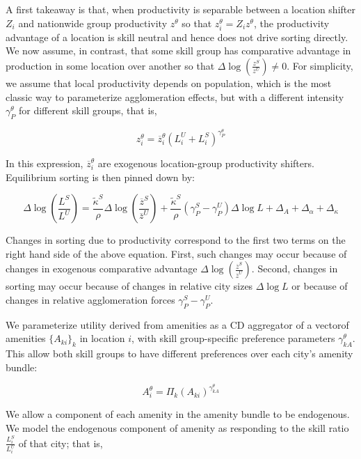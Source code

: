A first takeaway is that, when productivity is separable between a location shifter $Z_i$ and nationwide group productivity $z^{\theta}$ so that $z_i^{\theta} = Z_i z^{\theta}$, the productivity advantage of a location is skill neutral and hence does not drive sorting directly. We now assume, in contrast, that some skill group has comparative advantage in production in some location over another so that $\Delta \log(\frac{z^S}{z^U}) \neq 0$. For simplicity, we assume that local productivity depends on population, which is the most classic way to parameterize agglomeration effects, but with a different intensity $\gamma_P^{\theta}$ for different skill groups, that is,

\begin{equation}
  z_i^{\theta} = \overline{z}_i^{\theta}(L_i^U + L_i^S)^{\gamma_P^{\theta}} 
\end{equation}

In this expression, $\overline{z}_i^{\theta}$ are exogenous location-group productivity shifters. Equilibrium sorting is then pinned down by:

\begin{equation*}
  \Delta \log(\frac{L^S}{L^U}) = \frac{\tilde{\kappa}^S}{\rho} \Delta \log(\frac{\overline{z}^S}{\overline{z}^U}) + \frac{\tilde{\kappa}^S}{\rho}(\gamma_P^S - \gamma_P^U) \Delta \log L + \Delta_A + \Delta_{\alpha} + \Delta_{\kappa}
\end{equation*}

Changes in sorting due to productivity correspond to the first two terms on the right hand side of the above equation. First, such changes may occur because of changes in exogenous comparative advantage $\Delta \log(\frac{\overline{z}^S}{\overline{z}^U})$. Second, changes in sorting may occur because of changes in relative city sizes $\Delta \log L$ or because of changes in relative agglomeration forces $\gamma_P^S - \gamma_P^U$.

We parameterize utility derived from amenities as a CD aggregator of a vectorof amenities $\{A_{ki}\}_{k}$ in location $i$, with skill group-specific preference parameters $\gamma_{kA}^{\theta}$. This allow both skill groups to have different preferences over each city's amenity bundle:

\begin{equation}
  A_i^{\theta} = \Pi_k (A_{ki})^{\gamma_{kA}^{\theta}}
\end{equation}

We allow a component of each amenity in the amenity bundle to be endogenous. We model the endogenous component of amenity as responding to the skill ratio $\frac{L_i^S}{L_i^U}$ of that city; that is,

